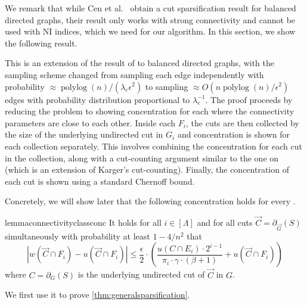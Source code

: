 \documentclass[11pt,a4paper]{article}
\newcommand{\polylog}{\operatorname{polylog}}
\newcommand{\abs}[1]{\ensuremath{\left| #1 \right|}}
\newcommand{\eps}{\epsilon}
\newcommand{\bound}{\abs{w(\vec{C} \cap F_i) - u(\vec{C} \cap F_i)} \le \frac{\eps}{2} \cdot \left( \frac{u(C \cap E_i) \cdot 2^{i-1}}{\pi_i \cdot \gamma \cdot (\beta+1)} + u(\vec{C} \cap F_i) \right)}
\begin{document}
We remark that while Cen et al.~\cite{CCPS21cutbalance} obtain a cut sparsification result for balanced directed graphs, their result only works with strong connectivity and cannot be used with NI indices, which we need for our algorithm.
In this section, we show the following result.

\generalsparsification*

This is an extension of the result of \cite{FHHP19sparsification} to balanced directed graphs, with the sampling scheme changed from sampling each edge independently with probability $\approx \polylog (n)/(\lambda_e \eps^2)$ to sampling $\approx O( n \polylog(n)/ \eps^2)$ edges with probability distribution proportional to $\lambda_e^{-1}$. The proof proceeds by reducing the problem to showing concentration for each \connectivityclass where the connectivity parameters are close to each other. Inside each \connectivityclass $F_i$, the cuts are then collected by the size of the underlying undirected cut in $G_i$ and concentration is shown for each collection separately. This involves combining the concentration for each cut in the collection, along with a cut-counting argument similar to the one on \cite{FHHP19sparsification} (which is an extension of Karger's cut-counting). Finally, the concentration of each cut is shown using a standard Chernoff bound.

Concretely, we will show later that the following concentration holds for every \connectivityclass.

\begin{restatable}{lemma}{connectivityclassconc}
\label{lem:connectivityclassconc}
It holds for all $i \in [\Lambda]$ and for all cuts $\vec{C} = \partial_{\vec{G}}(S)$ simultaneously with probability at least $1 - 4/n^2$ that
\[
\bound
\]
where $C = \partial_G(S)$ is the underlying undirected cut of $\vec{C}$ in $G$.
\end{restatable}

We first use it to prove \cref{thm:generalsparsification}.
\end{document}
